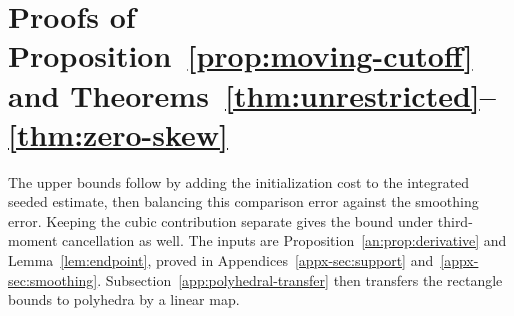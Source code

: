 \documentclass[11pt,letterpaper]{article}
\theoremstyle{remark}
\begin{document}
\section{\texorpdfstring{Proofs of Proposition~\ref{prop:moving-cutoff} and Theorems~\ref{thm:unrestricted}--\ref{thm:zero-skew}}{Proofs of Proposition 2 and Theorems 1--3}}\label{sec:main-proof}
The upper bounds follow by adding the initialization cost to the
integrated seeded estimate, then balancing this comparison error
against the smoothing error. Keeping the cubic contribution separate
gives the bound under third-moment cancellation as well. The inputs are
Proposition~\ref{an:prop:derivative} and Lemma~\ref{lem:endpoint},
proved in Appendices~\ref{appx-sec:support} and~\ref{appx-sec:smoothing}.
Subsection~\ref{app:polyhedral-transfer} then transfers the rectangle
bounds to polyhedra by a linear map.
\end{document}
